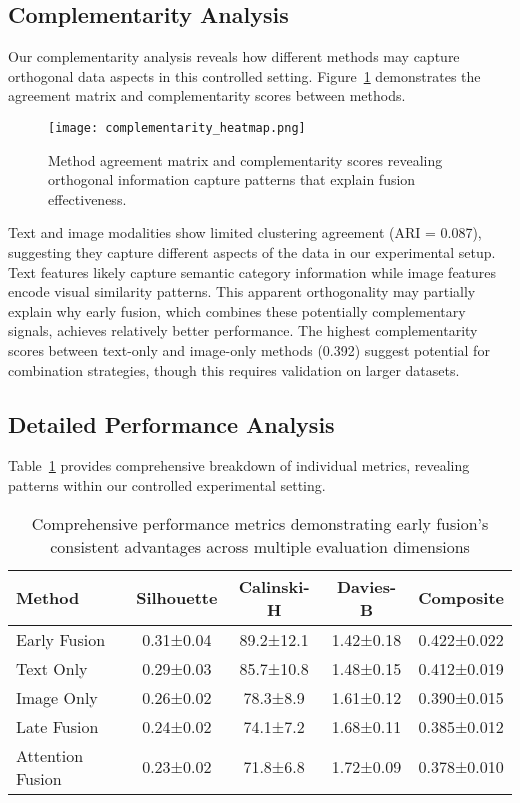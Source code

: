 \documentclass[sigconf]{acmart}
\begin{document}
\subsection{Complementarity Analysis}

Our complementarity analysis reveals how different methods may capture orthogonal data aspects in this controlled setting. Figure~\ref{fig:complementarity} demonstrates the agreement matrix and complementarity scores between methods.

\begin{figure}[h!]
\centering
\texttt{[image: complementarity\_heatmap.png]}
\caption{Method agreement matrix and complementarity scores revealing orthogonal information capture patterns that explain fusion effectiveness.}
\label{fig:complementarity}
\end{figure}

Text and image modalities show limited clustering agreement (ARI = 0.087), suggesting they capture different aspects of the data in our experimental setup. Text features likely capture semantic category information while image features encode visual similarity patterns. This apparent orthogonality may partially explain why early fusion, which combines these potentially complementary signals, achieves relatively better performance. The highest complementarity scores between text-only and image-only methods (0.392) suggest potential for combination strategies, though this requires validation on larger datasets.

\subsection{Detailed Performance Analysis}

Table~\ref{tab:detailed} provides comprehensive breakdown of individual metrics, revealing patterns within our controlled experimental setting.

\begin{table}[h!]
\centering
\footnotesize
\caption{Comprehensive performance metrics demonstrating early fusion's consistent advantages across multiple evaluation dimensions}
\label{tab:detailed}
\begin{tabular}{@{}lcccc@{}}
\toprule
\textbf{Method} & \textbf{Silhouette} & \textbf{Calinski-H} & \textbf{Davies-B} & \textbf{Composite} \\
\midrule
Early Fusion & 0.31±0.04 & 89.2±12.1 & 1.42±0.18 & 0.422±0.022 \\
Text Only & 0.29±0.03 & 85.7±10.8 & 1.48±0.15 & 0.412±0.019 \\
Image Only & 0.26±0.02 & 78.3±8.9 & 1.61±0.12 & 0.390±0.015 \\
Late Fusion & 0.24±0.02 & 74.1±7.2 & 1.68±0.11 & 0.385±0.012 \\
Attention Fusion & 0.23±0.02 & 71.8±6.8 & 1.72±0.09 & 0.378±0.010 \\
\bottomrule
\end{tabular}
\end{table}
\end{document}
